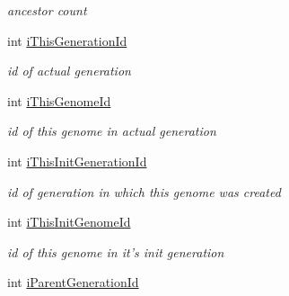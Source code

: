 \begin{DoxyCompactItemize}
\begin{DoxyCompactList}\small\item\em ancestor count \item\end{DoxyCompactList}\item 
\hypertarget{classCGenome_abc89d9f084ef0ebe2a4a61b6edd87573}{
int \hyperlink{classCGenome_abc89d9f084ef0ebe2a4a61b6edd87573}{iThisGenerationId}}
\label{classCGenome_abc89d9f084ef0ebe2a4a61b6edd87573}

\begin{DoxyCompactList}\small\item\em id of actual generation \item\end{DoxyCompactList}\item 
\hypertarget{classCGenome_ab1c7fb7723c614f069f1857eb730033e}{
int \hyperlink{classCGenome_ab1c7fb7723c614f069f1857eb730033e}{iThisGenomeId}}
\label{classCGenome_ab1c7fb7723c614f069f1857eb730033e}

\begin{DoxyCompactList}\small\item\em id of this genome in actual generation \item\end{DoxyCompactList}\item 
\hypertarget{classCGenome_a46ec230bb97402ef89a0774d326c81e4}{
int \hyperlink{classCGenome_a46ec230bb97402ef89a0774d326c81e4}{iThisInitGenerationId}}
\label{classCGenome_a46ec230bb97402ef89a0774d326c81e4}

\begin{DoxyCompactList}\small\item\em id of generation in which this genome was created \item\end{DoxyCompactList}\item 
\hypertarget{classCGenome_a152f4e6e52eff010f95aff1304993ede}{
int \hyperlink{classCGenome_a152f4e6e52eff010f95aff1304993ede}{iThisInitGenomeId}}
\label{classCGenome_a152f4e6e52eff010f95aff1304993ede}

\begin{DoxyCompactList}\small\item\em id of this genome in it's init generation \item\end{DoxyCompactList}\item 
\hypertarget{classCGenome_a20c45f657e79b4ce4e0083fbf8b2b87d}{
int \hyperlink{classCGenome_a20c45f657e79b4ce4e0083fbf8b2b87d}{iParentGenerationId}}
\label{classCGenome_a20c45f657e79b4ce4e0083fbf8b2b87d}


\end{DoxyCompactItemize}
